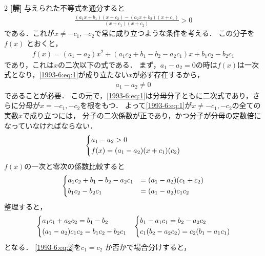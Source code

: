\documentclass[../../../../main.tex]{subfiles}
\begin{document}
\setcounter{equation}{0}
\begin{oframed}
  
\end{oframed}
\setlength{\columnseprule}{0.4pt}
\begin{multicols}{2}
  {\bf[解]}
  与えられた不等式を通分すると
  \begin{align}
    \frac{(a_1 x + b_1)(x + c_2) - (a_2 x + b_2)(x + c_1)}{(x + c_1)(x + c_2)} > 0 \label{1993-6:eq:1}
  \end{align}
  である．これが$x\neq -c_1,-c_2$で常に成り立つような条件を考える．
  この分子を $f(x)$ とおくと，
  \begin{align}
    f(x) = (a_1 - a_2)x^2 + (a_1 c_2 + b_1 - b_2 - a_2 c_1)x + b_1 c_2 - b_2 c_1
  \end{align}
  であり，これは$x$の二次以下の式である．
  まず，$a_1-a_2=0$の時は$f(x)$は一次式となり，\cref{1993-6:eq:1}が成り立たない$x$が必ず存在するから，
  \begin{align}
    a_1-a_2 \neq 0\label{1993-6:eq:3}
  \end{align}
  であることが必要．
  この元で，\cref{1993-6:eq:1}は分母分子ともに二次式であり，さらに分母が$x=-c_1,-c_2$を根をもつ．
  よって\cref{1993-6:eq:1}が$x\neq -c_1,-c_2$の全ての実数$x$で成り立つには，
  分子の二次係数が正であり，かつ分子が分母の定数倍になっていなければならない．
  \begin{align*}
    \begin{dcases}
      a_1-a_2 > 0 \\
      f(x) = (a_1-a_2)(x+c_1)(c_2)
    \end{dcases}
  \end{align*}
  $f(x)$の一次と零次の係数比較すると
  \begin{align*}
    \begin{dcases}
      a_1 c_2 + b_1 - b_2 - a_2 c_1 & = (a_1 - a_2)(c_1 + c_2) \\
      b_1 c_2 - b_2 c_1             & = (a_1 - a_2)c_1 c_2
    \end{dcases}
  \end{align*}
  整理すると，
  \begin{align}
     & \begin{dcases}
         a_1 c_1 + a_2 c_2 = b_1 - b_2 \\
         (a_1 - a_2)c_1 c_2 = b_1 c_2 - b_2 c_1
       \end{dcases}
     & \begin{dcases}
         b_1 - a_1 c_1 = b_2 - a_2 c_2 \\
         c_1(b_2 - a_2 c_2) = c_2(b_1 - a_1 c_1)
       \end{dcases} \label{1993-6:eq:2}
  \end{align}
  となる．
  \cref{1993-6:eq:2}を$c_1 = c_2$ か否かで場合分けすると，


\end{multicols}
\end{document}
